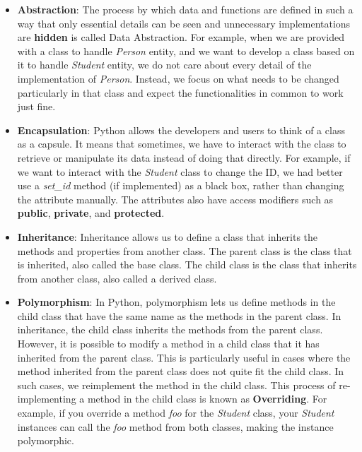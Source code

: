 \documentclass{homework}
\begin{document}
\question 
\begin{itemize}
    \item \textbf{Abstraction}: The process by which data and functions are defined in such a way that only essential details can be seen and unnecessary implementations are \textbf{hidden} is called Data Abstraction. For example, when we are provided with a class to handle \textit{Person} entity, and we want to develop a class based on it to handle \textit{Student} entity, we do not care about every detail of the implementation of \textit{Person}. Instead, we focus on what needs to be changed particularly in that class and expect the functionalities in common to work just fine.
    
    \item \textbf{Encapsulation}: Python allows the developers and users to think of a class as a capsule. It means that sometimes, we have to interact with the class to retrieve or manipulate its data instead of doing that directly. For example, if we want to interact with the \textit{Student} class to change the ID, we had better use a \textit{set\_id} method (if implemented) as a black box, rather than changing the attribute manually. The attributes also have access modifiers such as \textbf{public}, \textbf{private}, and \textbf{protected}.

    \item \textbf{Inheritance}: Inheritance allows us to define a class that inherits the methods and properties from another class. The parent class is the class that is inherited, also called the base class. The child class is the class that inherits from another class, also called a derived class.
    
    \item \textbf{Polymorphism}: In Python, polymorphism lets us define methods in the child class that have the same name as the methods in the parent class. In inheritance, the child class inherits the methods from the parent class. However, it is possible to modify a method in a child class that it has inherited from the parent class. This is particularly useful in cases where the method inherited from the parent class does not quite fit the child class. In such cases, we reimplement the method in the child class. This process of re-implementing a method in the child class is known as \textbf{Overriding}. For example, if you override a method \textit{foo} for the \textit{Student} class, your \textit{Student} instances can call the \textit{foo} method from both classes, making the instance polymorphic.
    
\end{itemize}



\end{document}
